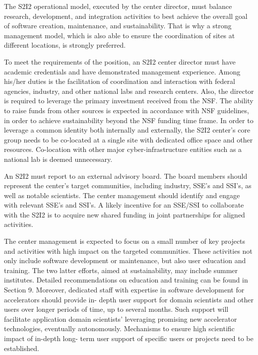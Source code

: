 The S2I2 operational model, executed by the center director, must balance research, development, and integration activities to best achieve the overall goal of software creation, maintenance, and sustainability. That is why a strong management model, which is also able to ensure the coordination of sites at different locations, is strongly preferred.

To meet the requirements of the position, an S2I2 center director must have academic credentials and have demonstrated management experience. Among his/her duties is the facilitation of coordination and interaction with federal agencies, industry, and other national labs and research centers. Also, the director is required to leverage the primary investment received from the NSF. The ability to raise funds from other sources is expected in accordance with NSF guidelines, in order to achieve sustainability beyond the NSF funding time frame.
In order to leverage a common identity both internally and externally, the S2I2 center's core group needs to be co-located at a single site with dedicated office space and other resources. Co-location with other major cyber-infrastructure entities such as a national lab is deemed unnecessary.

An S2I2 must report to an external advisory board. The board members should represent the center's target communities, including industry, SSE's and SSI's, as well as notable scientists.
The center management should identify and engage with relevant SSE’s and SSI’s. A likely incentive for an SSE/SSI to collaborate with the S2I2 is to acquire new shared funding in joint partnerships for aligned activities.

The center management is expected to focus on a small number of key projects and activities with high impact on the targeted communities. These activities not only include software development or maintenance, but also user education and training. The two latter efforts, aimed at sustainability, may include summer institutes. Detailed recommendations on education and training can be found in Section 9. Moreover, dedicated staff with expertise in software development for accelerators should provide in- depth user support for domain scientists and other users over longer periods of time, up to several months. Such support will facilitate application domain scientists’ leveraging promising new accelerator technologies, eventually autonomously. Mechanisms to ensure high scientific impact of in-depth long- term user support of specific users or projects need to be established.

